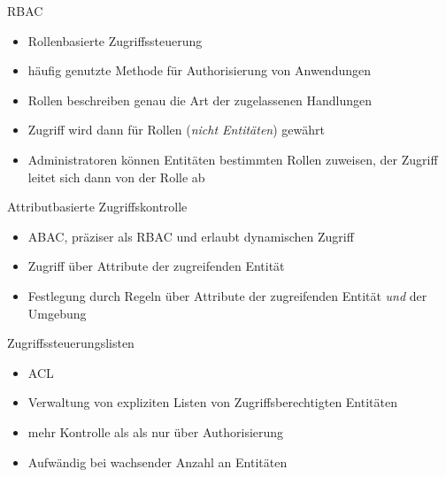 \begin{flashcard}[Definition]{RBAC}
  \begin{itemize}
    \item Rollenbasierte Zugriffssteuerung
    \item häufig genutzte Methode für Authorisierung von Anwendungen
    \item Rollen beschreiben genau die Art der zugelassenen Handlungen
    \item Zugriff wird dann für Rollen (\emph{nicht Entitäten}) gewährt
    \item Administratoren können Entitäten bestimmten Rollen zuweisen,\newline
      der Zugriff leitet sich dann von der Rolle ab
  \end{itemize}
\end{flashcard}

\begin{flashcard}[Definition]{Attributbasierte Zugriffskontrolle}
  \begin{itemize}
    \item ABAC, präziser als RBAC und erlaubt dynamischen Zugriff
    \item Zugriff über Attribute der zugreifenden Entität
    \item Festlegung durch Regeln über Attribute der zugreifenden Entität \emph{und} der Umgebung
  \end{itemize}
\end{flashcard}

\begin{flashcard}[Definition]{Zugriffssteuerungslisten}
  \begin{itemize}
    \item ACL
    \item Verwaltung von expliziten Listen von Zugriffsberechtigten Entitäten
    \item mehr Kontrolle als als nur über Authorisierung
    \item Aufwändig bei wachsender Anzahl an Entitäten
  \end{itemize}
\end{flashcard}

